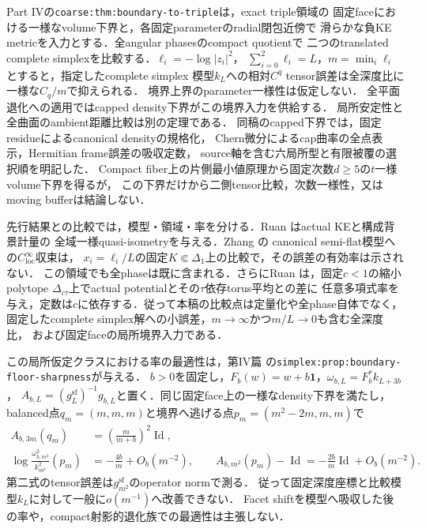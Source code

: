 \documentclass[a4paper,11pt]{ltjsarticle}
\numberwithin{equation}{section}
\theoremstyle{plain}
\theoremstyle{definition}
\theoremstyle{remark}
\begin{document}
Part IVの\texttt{coarse:thm:boundary-to-triple}は，exact triple領域の
固定faceにおける一様なvolume下界と，各固定parameterのradial閉包近傍で
滑らかな負KE metricを入力とする．全angular phasesのcompact quotientで
二つのtranslated complete simplexを比較する．$\ell_i=-\log|z_i|^2$，
$\sum_{i=0}^2\ell_i=L$，$m=\min_i\ell_i$ とすると，指定したcomplete simplex
模型$k_L$への相対$C^q$ tensor誤差は全深度比に一様な$C_q/m$で抑えられる．
境界上界のparameter一様性は仮定しない．
全平面退化への適用ではcapped density下界がこの境界入力を供給する．
局所安定性と全曲面のambient距離比較は別の定理である．
同稿のcapped下界では，固定residueによるcanonical densityの規格化，
Chern微分によるcap曲率の全点表示，Hermitian frame誤差の吸収定数，
source軸を含む六局所型と有限被覆の選択順を明記した．
Compact fiber上の片側最小値原理から固定次数$d\ge5$の$t$一様volume下界を得るが，
この下界だけから二側tensor比較，次数一様性，又はmoving bufferは結論しない．

先行結果との比較では，模型・領域・率を分ける．Ruan
\cite[Theorem~4.2]{RuanI}\cite[Theorem~5.2]{RuanII}はactual KEと構成背景計量の
全域一様quasi-isometryを与える．Zhang
\cite[Theorem~2.4(ii), Lemmas~3.2--3.3 and~3.5, Proposition~3.4]{ZhangNegativeKE}の
canonical semi-flat模型への$C^\infty_{\mathrm{loc}}$収束は，
$x_i=\ell_i/L$の固定$K\Subset\Delta_1$上の比較で，その誤差の有効率は示されない．
この領域でも全phaseは既に含まれる．さらにRuan
\cite[Proposition~3.1, Corollary~3.1]{RuanHMinimal}は，固定$c<1$の縮小polytope
$\Delta_{c\tau}$上でactual potentialとその$\tau$依存torus平均との差に
任意多項式率を与え，定数は$c$に依存する．従って本稿の比較点は定量化や全phase自体でなく，
固定したcomplete simplex解への小誤差，$m\to\infty$かつ$m/L\to0$も含む全深度比，
および固定faceの局所境界入力である．

この局所仮定クラスにおける率の最適性は，第IV篇
\cite{KEIV}の\texttt{simplex:prop:boundary-floor-sharpness}が与える．
$b>0$を固定し，$F_b(w)=w+b\mathbf1$，$\omega_{b,L}=F_b^*k_{L+3b}$，
$A_{b,L}=(g_L^{\mathrm{sf}})^{-1}g_{b,L}$と置く．同じ固定face上の一様なdensity下界を満たし，
balanced点$q_m=(m,m,m)$と境界へ逃げる点$p_m=(m^2-2m,m,m)$で
\[
 \begin{aligned}
 A_{b,3m}(q_m)&=\left(\frac{m}{m+b}\right)^2\operatorname{Id},\\
 \log\frac{\omega_{b,m^2}^2}{k_{m^2}^2}(p_m)
     &=-\frac{4b}{m}+O_b(m^{-2}),\qquad
 A_{b,m^2}(p_m)-\operatorname{Id}
     =-\frac{2b}{m}\operatorname{Id}+O_b(m^{-2}).
 \end{aligned}
\]
第二式のtensor誤差は$g_{m^2}^{\mathrm{sf}}$のoperator normで測る．
従って固定深度座標と比較模型$k_L$に対して一般に$o(m^{-1})$へ改善できない．
Facet shiftを模型へ吸収した後の率や，compact射影的退化族での最適性は主張しない．
\end{document}
